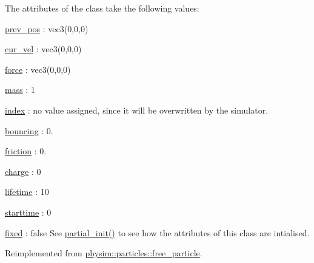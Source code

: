 The attributes of the class take the following values\+:
\begin{DoxyItemize}
\item \hyperlink{classphysim_1_1particles_1_1base__particle_a08072db6a1a59d21acc9cac6ac8965f7}{prev\+\_\+pos} \+: vec3(0,0,0)
\item \hyperlink{classphysim_1_1particles_1_1base__particle_a66a164d2a130c40901e3ec2709cdad43}{cur\+\_\+vel} \+: vec3(0,0,0)
\item \hyperlink{classphysim_1_1particles_1_1base__particle_adc3b11899d2e50970ae5d4931721a0ef}{force} \+: vec3(0,0,0)
\item \hyperlink{classphysim_1_1particles_1_1base__particle_acb5c9f0b4a911d8981210e2cfc4dda8a}{mass} \+: 1
\item \hyperlink{classphysim_1_1particles_1_1base__particle_a44f5de3bb4b860dfd511e28e1d6519d5}{index} \+: no value assigned, since it will be overwritten by the simulator.
\item \hyperlink{classphysim_1_1particles_1_1free__particle_aac766fa5294e47b944d32ca3e38d47fa}{bouncing} \+: 0.
\item \hyperlink{classphysim_1_1particles_1_1free__particle_a9e7dfd81e9392fc42b3faecb57afdc02}{friction} \+: 0.
\item \hyperlink{classphysim_1_1particles_1_1free__particle_a7513ac41f3cab1ce083f8695e2c73301}{charge} \+: 0
\item \hyperlink{classphysim_1_1particles_1_1free__particle_a5870d6fd3167d2c6120f887f45fe50fc}{lifetime} \+: 10
\item \hyperlink{classphysim_1_1particles_1_1free__particle_ad0379ba926ecc909bfbfb373045bfcf9}{starttime} \+: 0
\item \hyperlink{classphysim_1_1particles_1_1free__particle_a0f6d69caeac140abd74c7be4ed55eb74}{fixed} \+: false See \hyperlink{classphysim_1_1particles_1_1sized__particle_a30eee2e3b0c0cf9e6f56a21e10a424f3}{partial\+\_\+init()} to see how the attributes of this class are intialised. 
\end{DoxyItemize}

Reimplemented from \hyperlink{classphysim_1_1particles_1_1free__particle_a0df21e64a28c5fdf471d54a50b59fea3}{physim\+::particles\+::free\+\_\+particle}.

\mbox{\label{classphysim_1_1particles_1_1sized__particle_a30eee2e3b0c0cf9e6f56a21e10a424f3}} 
